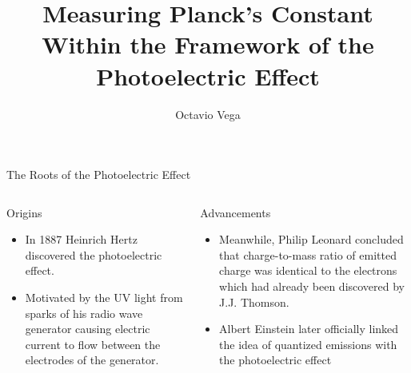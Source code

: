 \documentclass[hyperref=pdftex, presentation]{beamer}
\title[Measuring Planck's Constant] %
{Measuring Planck's Constant Within the Framework of the Photoelectric Effect}
\author[Octavio Vega]{Octavio Vega}
\institute[] {MIT - Department of Physics\\}
\date[\today]
\begin{document}
\begin{frame}
  \titlepage
\end{frame}





\begin{frame}{\Large The Roots of the Photoelectric Effect}
\begin{columns}[c] %

\begin{block}{Origins}
\begin{itemize}
 \item In 1887 Heinrich Hertz discovered the photoelectric effect.
 \item Motivated by the UV light from sparks of his radio wave generator causing electric current to flow between the electrodes of the generator. 
\end{itemize}
\end{block}
\begin{block}{Advancements}
\begin{itemize}
 \item Meanwhile, Philip Leonard concluded that charge-to-mass ratio of emitted charge was identical to the electrons which had already been discovered by J.J. Thomson.
 \item Albert Einstein later officially linked the idea of quantized emissions with the photoelectric effect
\end{itemize}
\end{block}

\end{columns}
\end{frame}
\end{document}
